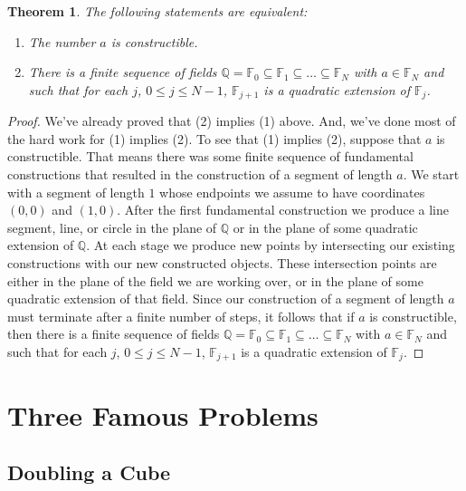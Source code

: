 \documentclass[11pt]{article}
\renewcommand\subset\subseteq
\newtheorem{theorem}{Theorem}[section]
\theoremstyle{definition}
\begin{document}
\begin{theorem}
  The following statements are equivalent:
  \begin{enumerate}
    \item The number $a$ is constructible.
    \item There is a finite sequence of fields $\mathbb{Q} = \mathbb{F}_0 \subset \mathbb{F}_1\subset \dots \subset \mathbb{F}_N$ with
  $a\in\mathbb{F}_N$ and such that for each $j$, $0\leq j \leq N-1$, $\mathbb{F}_{j+1}$ is a quadratic extension of $\mathbb{F}_j$.
  \end{enumerate}
  \label{theorem: constructible iff in sequence of quadratic extensions}
\end{theorem}
\begin{proof}
  We've already proved that (2) implies (1) above. And, we've done most of the hard work for (1) implies (2). To see that (1) implies (2),
  suppose that $a$ is constructible. That means there was some finite sequence of fundamental constructions that resulted in the construction
  of a segment of length $a$. We start with a segment of length $1$ whose endpoints we assume to have coordinates $(0,0)$ and $(1,0)$. After the
  first fundamental construction we produce a line segment, line, or circle in the plane of $\mathbb{Q}$ or in the plane of some
  quadratic extension of $\mathbb{Q}$. At each stage we produce new points by intersecting our existing constructions with our new constructed
  objects. These intersection points are either in the plane of the field we are working over, or in the plane of some quadratic extension of that
  field. Since our construction of a segment of length $a$ must terminate after a finite number of steps, it follows that if $a$ is constructible,
  then there is a finite sequence of fields $\mathbb{Q} = \mathbb{F}_0 \subset \mathbb{F}_1\subset \dots \subset \mathbb{F}_N$ with
  $a\in\mathbb{F}_N$ and such that for each $j$, $0\leq j \leq N-1$, $\mathbb{F}_{j+1}$ is a quadratic extension of $\mathbb{F}_j$.
\end{proof}

\section{Three Famous Problems}

\subsection{Doubling a Cube}
\end{document}

